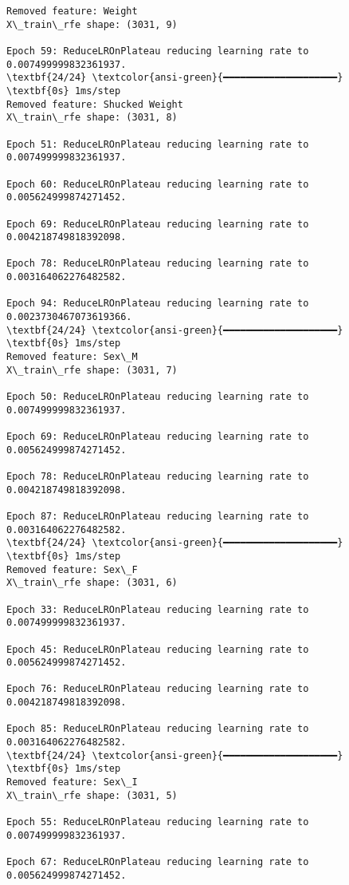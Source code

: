 \documentclass[11pt]{article}
\begin{document}
    \begin{Verbatim}[commandchars=\\\{\}]
Removed feature: Weight
X\_train\_rfe shape: (3031, 9)

Epoch 59: ReduceLROnPlateau reducing learning rate to 0.007499999832361937.
\textbf{24/24} \textcolor{ansi-green}{━━━━━━━━━━━━━━━━━━━━} \textbf{0s} 1ms/step
Removed feature: Shucked Weight
X\_train\_rfe shape: (3031, 8)

Epoch 51: ReduceLROnPlateau reducing learning rate to 0.007499999832361937.

Epoch 60: ReduceLROnPlateau reducing learning rate to 0.005624999874271452.

Epoch 69: ReduceLROnPlateau reducing learning rate to 0.004218749818392098.

Epoch 78: ReduceLROnPlateau reducing learning rate to 0.003164062276482582.

Epoch 94: ReduceLROnPlateau reducing learning rate to 0.0023730467073619366.
\textbf{24/24} \textcolor{ansi-green}{━━━━━━━━━━━━━━━━━━━━} \textbf{0s} 1ms/step
Removed feature: Sex\_M
X\_train\_rfe shape: (3031, 7)

Epoch 50: ReduceLROnPlateau reducing learning rate to 0.007499999832361937.

Epoch 69: ReduceLROnPlateau reducing learning rate to 0.005624999874271452.

Epoch 78: ReduceLROnPlateau reducing learning rate to 0.004218749818392098.

Epoch 87: ReduceLROnPlateau reducing learning rate to 0.003164062276482582.
\textbf{24/24} \textcolor{ansi-green}{━━━━━━━━━━━━━━━━━━━━} \textbf{0s} 1ms/step
Removed feature: Sex\_F
X\_train\_rfe shape: (3031, 6)

Epoch 33: ReduceLROnPlateau reducing learning rate to 0.007499999832361937.

Epoch 45: ReduceLROnPlateau reducing learning rate to 0.005624999874271452.

Epoch 76: ReduceLROnPlateau reducing learning rate to 0.004218749818392098.

Epoch 85: ReduceLROnPlateau reducing learning rate to 0.003164062276482582.
\textbf{24/24} \textcolor{ansi-green}{━━━━━━━━━━━━━━━━━━━━} \textbf{0s} 1ms/step
Removed feature: Sex\_I
X\_train\_rfe shape: (3031, 5)

Epoch 55: ReduceLROnPlateau reducing learning rate to 0.007499999832361937.

Epoch 67: ReduceLROnPlateau reducing learning rate to 0.005624999874271452.


\end{Verbatim}
\end{document}
